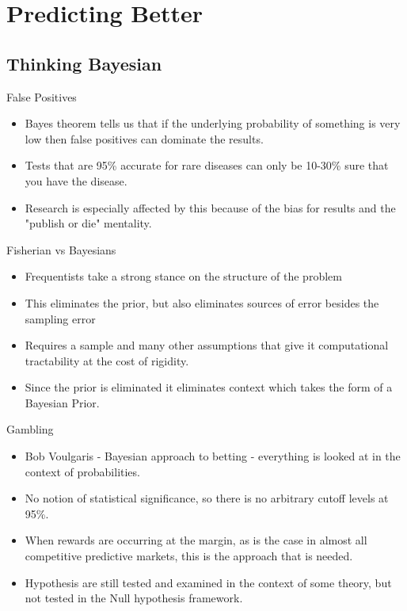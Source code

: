 \documentclass[bigger]{beamer}
\begin{document}
\section{Predicting Better}
\label{sec-4}
\subsection{Thinking Bayesian}
\label{sec-4-1}
\begin{frame}[label=sec-4-1-1]{False Positives}
\begin{itemize}
\item Bayes theorem tells us that if the underlying probability of
something is very low then false positives can dominate the results.
\item Tests that are 95\% accurate for rare diseases can only be 10-30\%
sure that you have the disease.
\item Research is especially affected by this because of the bias for
results and the "publish or die" mentality.
\end{itemize}
\end{frame}

\begin{frame}[label=sec-4-1-2]{Fisherian vs Bayesians}
\begin{itemize}
\item Frequentists take a strong stance on the structure of the problem
\item This eliminates the prior, but also eliminates sources of error
besides the sampling error
\item Requires a sample and many other assumptions that give it
computational tractability at the cost of rigidity.
\item Since the prior is eliminated it eliminates context which takes the
form of a Bayesian Prior.
\end{itemize}
\end{frame}

\begin{frame}[label=sec-4-1-3]{Gambling}
\begin{itemize}
\item Bob Voulgaris - Bayesian approach to betting - everything is looked
at in the context of probabilities.
\item No notion of statistical significance, so there is no arbitrary
cutoff levels at 95\%.
\item When rewards are occurring at the margin, as is the case in almost
all competitive predictive markets, this is the approach that is
needed.
\item Hypothesis are still tested and examined in the context of some
theory, but not tested in the Null hypothesis framework.
\end{itemize}
\end{frame}
\end{document}
